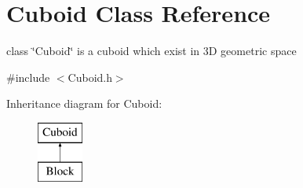 \hypertarget{classCuboid}{\section{\-Cuboid \-Class \-Reference}
\label{classCuboid}
}


class \char`\"{}\-Cuboid\char`\"{} is a cuboid which exist in 3\-D geometric space  




{\ttfamily \#include $<$\-Cuboid.\-h$>$}

\-Inheritance diagram for \-Cuboid\-:\begin{figure}[H]
\begin{center}
\leavevmode
\includegraphics[height=2.000000cm]{classCuboid}
\end{center}
\end{figure}
